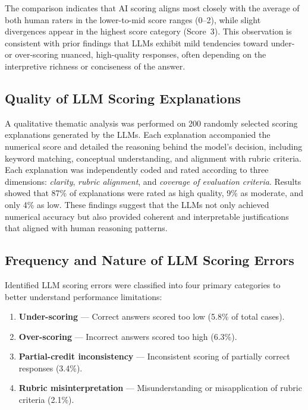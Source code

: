 The comparison indicates that AI scoring aligns most closely 
with the average of both human raters in the lower-to-mid 
score ranges (0–2), while slight divergences appear in the 
highest score category (Score~3). 
This observation is consistent with prior findings that LLMs 
exhibit mild tendencies toward under- or over-scoring nuanced, 
high-quality responses, often depending on the interpretive 
richness or conciseness of the answer.

\subsection{Quality of LLM Scoring Explanations}

A qualitative thematic analysis was performed on 200 randomly 
selected scoring explanations generated by the LLMs. 
Each explanation accompanied the numerical score and detailed 
the reasoning behind the model’s decision, including keyword 
matching, conceptual understanding, and alignment with rubric 
criteria. Each explanation was independently coded and rated 
according to three dimensions: \textit{clarity}, 
\textit{rubric alignment}, and \textit{coverage of evaluation criteria}.  
Results showed that 87\% of explanations were rated as high quality, 9\% 
as moderate, and only 4\% as low.  
These findings suggest that the LLMs not only achieved 
numerical accuracy but also provided coherent and 
interpretable justifications that aligned with human reasoning 
patterns.

\subsection{Frequency and Nature of LLM Scoring Errors}

Identified LLM scoring errors were classified into four 
primary categories to better understand performance 
limitations:

\begin{enumerate}
    \item \textbf{Under-scoring} — Correct answers scored too low (5.8\% of total cases).  
    \item \textbf{Over-scoring} — Incorrect answers scored too high (6.3\%).  
    \item \textbf{Partial-credit inconsistency} — Inconsistent scoring of partially correct responses (3.4\%).  
    \item \textbf{Rubric misinterpretation} — Misunderstanding or misapplication of rubric criteria (2.1\%).  
\end{enumerate}

